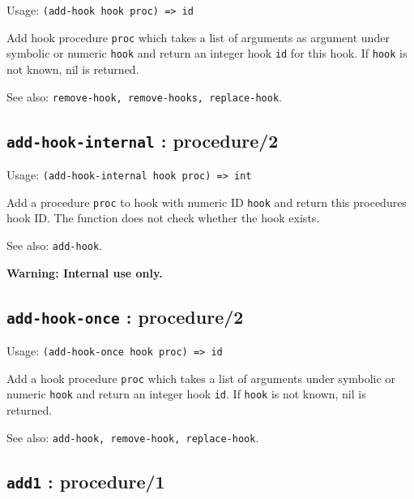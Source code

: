 \documentclass[
]{article}
\newcommand{\passthrough}[1]{#1}
\begin{document}
Usage: \passthrough{\lstinline!(add-hook hook proc) => id!}

Add hook procedure \passthrough{\lstinline!proc!} which takes a list of
arguments as argument under symbolic or numeric
\passthrough{\lstinline!hook!} and return an integer hook
\passthrough{\lstinline!id!} for this hook. If
\passthrough{\lstinline!hook!} is not known, nil is returned.

See also:
\passthrough{\lstinline!remove-hook, remove-hooks, replace-hook!}.

\hypertarget{add-hook-internal-procedure2-1}{%
\subsection{\texorpdfstring{\texttt{add-hook-internal} :
procedure/2}{add-hook-internal : procedure/2}}\label{add-hook-internal-procedure2-1}}

Usage: \passthrough{\lstinline!(add-hook-internal hook proc) => int!}

Add a procedure \passthrough{\lstinline!proc!} to hook with numeric ID
\passthrough{\lstinline!hook!} and return this procedures hook ID. The
function does not check whether the hook exists.

See also: \passthrough{\lstinline!add-hook!}.

\textbf{Warning: Internal use only.}

\hypertarget{add-hook-once-procedure2-1}{%
\subsection{\texorpdfstring{\texttt{add-hook-once} :
procedure/2}{add-hook-once : procedure/2}}\label{add-hook-once-procedure2-1}}

Usage: \passthrough{\lstinline!(add-hook-once hook proc) => id!}

Add a hook procedure \passthrough{\lstinline!proc!} which takes a list
of arguments under symbolic or numeric \passthrough{\lstinline!hook!}
and return an integer hook \passthrough{\lstinline!id!}. If
\passthrough{\lstinline!hook!} is not known, nil is returned.

See also: \passthrough{\lstinline!add-hook, remove-hook, replace-hook!}.

\hypertarget{add1-procedure1-1}{%
\subsection{\texorpdfstring{\texttt{add1} :
procedure/1}{add1 : procedure/1}}\label{add1-procedure1-1}}
\end{document}
